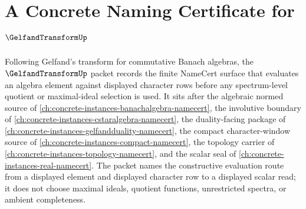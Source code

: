 \chapter{A Concrete Naming Certificate for $\GelfandTransformUp$}
\label{ch:concrete-instances-gelfand-transform-namecert}

Following Gelfand's transform for commutative Banach algebras, the $\GelfandTransformUp$ packet records the finite NameCert surface that evaluates an algebra element against displayed character rows before any spectrum-level quotient or maximal-ideal selection is used. It sits after the algebraic normed source of \autoref{ch:concrete-instances-banachalgebra-namecert}, the involutive boundary of \autoref{ch:concrete-instances-cstaralgebra-namecert}, the duality-facing package of \autoref{ch:concrete-instances-gelfandduality-namecert}, the compact character-window source of \autoref{ch:concrete-instances-compact-namecert}, the topology carrier of \autoref{ch:concrete-instances-topology-namecert}, and the scalar seal of \autoref{ch:concrete-instances-real-namecert}. The packet names the constructive evaluation route from a displayed element and displayed character row to a displayed scalar read; it does not choose maximal ideals, quotient functions, unrestricted spectra, or ambient completeness.

